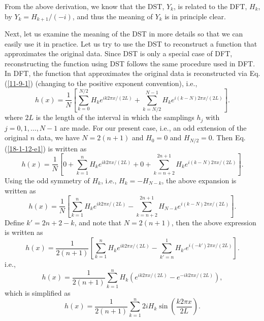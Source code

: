 \documentclass{article}
\begin{document}
From the above derivation, we know that the DST, $Y_k$, is related to the DFT,
$H_k$, by $Y_k = H_{k + 1} / (- i)$, and thus the meaning of $Y_k$ is in
principle clear.

Next, let us examine the meaning of the DST in more details so that we can
easily use it in practice. Let us try to use the DST to reconstruct a function
that approximates the original data. Since DST is only a special case of DFT,
reconstructing the function using DST follows the same procedure used in DFT.
In DFT, the function that approximates the original data is reconstructed via
Eq. (\ref{11-9-1}) (changing to the positive exponent convention), i.e.,
\begin{equation}
  \label{18-1-12-e1} h (x) = \frac{1}{N} \left[ \sum_{k = 0}^{N / 2} H_k e^{i
  k 2 \pi x / (2 L)} + \sum_{k = N / 2}^{N - 1} H_k e^{i (k - N) 2 \pi x / (2
  L)} \right] .
\end{equation}
where $2 L$ is the length of the interval in which the samplings $h_j$ with $j
= 0, 1, \ldots, N - 1$ are made. For our present case, i.e., an odd extension
of the original $n$ data, we have $N = 2 (n + 1)$ and $H_0 = 0$ and $H_{N / 2}
= 0$. Then Eq. (\ref{18-1-12-e1}) is written as
\begin{equation}
  h (x) = \frac{1}{N} \left[ 0 + \sum_{k = 1}^n H_k e^{i k 2 \pi x / (2 L)} +
  0 + \sum_{k = n + 2}^{2 n + 1} H_k e^{i (k - N) 2 \pi x / (2 L)} \right] .
\end{equation}
Using the odd symmetry of $H_k$, i.e., $H_k = - H_{N - k}$, the above
expansion is written as
\begin{equation}
  h (x) = \frac{1}{N} \left[ \sum_{k = 1}^n H_k e^{i k 2 \pi x / (2 L)} -
  \sum_{k = n + 2}^{2 n + 1} H_{N - k} e^{i (k - N) 2 \pi x / (2 L)} \right] .
\end{equation}
Define $k' = 2 n + 2 - k$, and note that $N = 2 (n + 1)$, then the above
expression is written as
\begin{equation}
  h (x) = \frac{1}{2 (n + 1)} \left[ \sum_{k = 1}^n H_k e^{i k 2 \pi x / (2
  L)} - \sum_{k' = n}^1 H_{k'} e^{i (- k') 2 \pi x / (2 L)} \right] .
\end{equation}
i.e.,
\begin{equation}
  h (x) = \frac{1}{2 (n + 1)} \sum_{k = 1}^n H_k (e^{i k 2 \pi x / (2 L)} -
  e^{- i k 2 \pi x / (2 L)}),
\end{equation}
which is simplified as
\begin{equation}
  \label{18-1-12-e3} h (x) = \frac{1}{2 (n + 1)} \sum_{k = 1}^n 2 i H_k \sin
  \left( \frac{k 2 \pi x}{2 L} \right) .
\end{equation}
\end{document}
